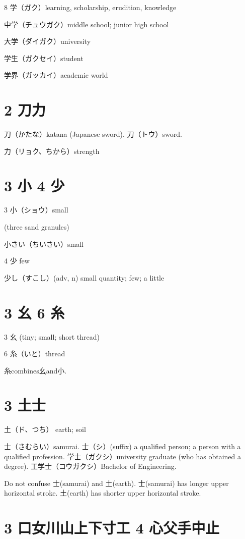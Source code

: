 8 学（ガク）learning, scholarship, erudition, knowledge

中学（チュウガク）middle school; junior high school

大学（ダイガク）university

学生（ガクセイ）student

学界（ガッカイ）academic world

\section{2 刀力}

刀（かたな）katana (Japanese sword).
刀（トウ）sword.

力（リョク、ちから）strength

\section{3 小 4 少}

3 小（ショウ）small

(three sand granules)

小さい（ちいさい）small

4 少 few

少し（すこし）(adv, n) small quantity; few; a little

\section{3 幺 6 糸}

3 幺 (tiny; small; short thread)

6 糸（いと）thread

糸combines幺and小.

\section{3 土士}

土（ド、つち） earth; soil

士（さむらい）samurai.
士（シ）(suffix)
a qualified person;
a person with a qualified profession.
学士（ガクシ）university graduate (who has obtained a degree).
工学士（コウガクシ）Bachelor of Engineering.

Do not confuse 士(samurai) and 土(earth).
士(samurai) has longer upper horizontal stroke.
土(earth) has shorter upper horizontal stroke.

\section{3 口女川山上下寸工 4 心父手中止}

